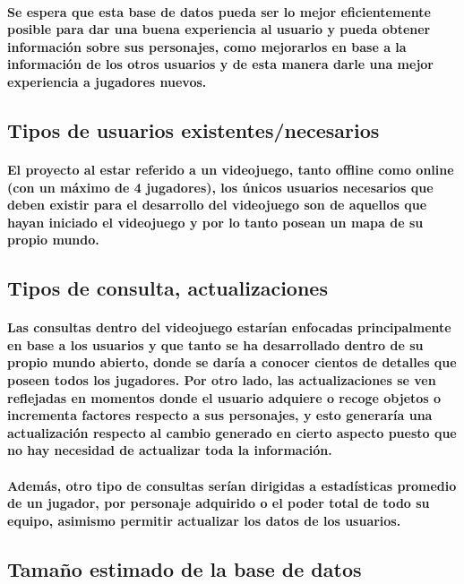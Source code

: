 \documentclass{report}
\begin{document}
\paragraph{Se espera que esta base de datos pueda ser lo mejor eficientemente posible para dar una buena experiencia al usuario y pueda obtener información sobre sus personajes, como mejorarlos en base a la información de los otros usuarios y de esta manera darle una mejor experiencia a jugadores nuevos.}

\subsection{Tipos de usuarios existentes/necesarios}
\paragraph{El proyecto al estar referido a un videojuego, tanto offline como online (con un máximo de 4 jugadores), los únicos usuarios necesarios que deben existir para el desarrollo del videojuego son de aquellos que hayan iniciado el videojuego y por lo tanto posean un mapa de su propio mundo.}

\subsection{Tipos de consulta, actualizaciones}
\paragraph{Las consultas dentro del videojuego estarían enfocadas principalmente en base a los usuarios y que tanto se ha desarrollado dentro de su propio mundo abierto, donde se daría a conocer cientos de detalles que poseen todos los jugadores. Por otro lado, las actualizaciones se ven reflejadas en momentos donde el usuario adquiere o recoge objetos o incrementa factores respecto a sus personajes, y esto generaría una actualización respecto al cambio generado en cierto aspecto puesto que no hay necesidad de actualizar toda la información.}
\paragraph{Además, otro tipo de consultas serían dirigidas a estadísticas promedio de un jugador, por personaje adquirido o el poder total de todo su equipo, asimismo permitir actualizar los datos de los usuarios.}

\subsection{Tamaño estimado de la base de datos}
\end{document}
